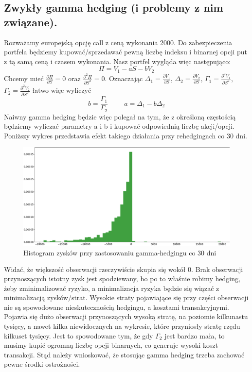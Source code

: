 \documentclass[12pt]{article}
\begin{document}
\subsection{Zwykły gamma hedging (i problemy z nim związane).}

Rozważamy europejską opcję call z ceną wykonania 2000. Do zabezpieczenia portfela będziemy kupować/sprzedawać pewną liczbę indeksu i binarnej opcji put z tą samą ceną i czasem wykonania. Nasz portfel wygląda więc następująco:
$$
\Pi = V_1 - aS - bV_2
$$
Chcemy mieć $\frac{\partial \Pi}{\partial S} = 0$ oraz $\frac{\partial^2 \Pi}{\partial S^2} = 0$. Oznaczając $\Delta_1 = \frac{\partial V_1}{\partial S}$, $\Delta_2 = \frac{\partial V_2}{\partial S}$, $\Gamma_1 = \frac{\partial^2 V_1}{\partial S^2}$, $\Gamma_2 = \frac{\partial^2 V_2}{\partial S^2}$ łatwo więc wyliczyć 
$$
b = \frac{\Gamma_1} {\Gamma_2} \hspace{1cm} a = \Delta_1 - b\Delta_2
$$
Naiwny gamma hedging będzie więc polegał na tym, że z określoną częstością będziemy wyliczać parametry a i b i kupować odpowiednią liczbę akcji/opcji. Poniższy wykres przedstawia efekt takiego działania przy rehedgingach co 30 dni.


\begin{figure}[htp]
    \centering
    \includegraphics[width=\textwidth,height=\textheight,keepaspectratio]{hist_nawiny_gamma_hedging(1).png}
    \caption{Histogram zysków przy zastosowaniu gamma-hedgingu co 30 dni}
    \label{fig:hist_naiwny_gamma_hedging}
\end{figure}

Widać, że większość obserwacji rzeczywiście skupia się wokół 0. Brak obserwacji przynoszących istotny zysk jest spodziewany, bo po to właśnie robimy hedging, żeby zminimalizować ryzyko, a minimalizacja ryzyka będzie się wiązać z minimalizacją zysków/strat. Wysokie straty pojawiające się przy części obserwacji nie są spowodowane nieskutecznością hedgingu, a kosztami transakcyjnymi. Pojawia się dużo obserwacji przynoszących wysoką stratę, na poziomie kilkunastu tysięcy, a nawet kilka niewidocznych na wykresie, które przyniosły stratę rzędu kilkuset tysięcy. Jest to spowodowane tym, że gdy $\Gamma_2$ jest bardzo mała, to musimy kupić ogromną liczbę opcji binarnych, co generuje wysoki koszt transakcji. Stąd należy wnioskować, że stosując gamma hedging trzeba zachować pewne środki ostrożności. 
\end{document}
